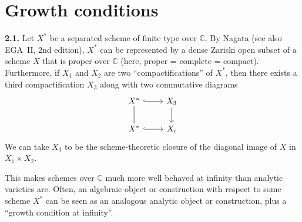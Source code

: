 \documentclass{report}
\newenvironment{itenv}[1]
  {\phantomsection\par\medskip\noindent\textbf{#1.}\itshape}
  {\medskip}
\newenvironment{rmenv}[1]
  {\phantomsection\par\medskip\noindent\textbf{#1.}\rmfamily}
  {\medskip}
\newcommand{\CC}{\mathbb{C}}
\newcommand{\oldpage}[1]{\marginpar{\footnotesize$\Big\vert$ \textit{p.~#1}}}
\begin{document}




\section{Growth conditions}
\label{II.2}

\begin{rmenv}{2.1}
\label{II.2.1}
  Let $X^*$ be a separated scheme of finite type over $\CC$.
  By Nagata \cite{20} (see also EGA~II, 2nd edition), $X^*$ can be represented by a dense Zariski open subset of a scheme $X$ that is proper over $\CC$ (here, proper = complete = compact).
  Furthermore, if $X_1$ and $X_2$ are two ``compactifications'' of $X^*$, then there exists a third compactification $X_3$ along with two commutative diagrams
  \[
    \begin{tikzcd}
      X^* \rar[hook] \dar[equal]
      & X_3 \dar
    \\ X^* \rar[hook]
      & X_i
    \end{tikzcd}
  \]
  We can take $X_3$ to be the scheme-theoretic closure of the diagonal image of $X$ in $X_1\times X_2$.

  This makes schemes over $\CC$ much more well behaved at infinity than analytic varieties are.
  Often, an algebraic object or construction with respect to some scheme $X^*$ can be seen as an analogous analytic object or construction, plus a ``growth condition at infinity''.
\end{rmenv}
\end{document}
